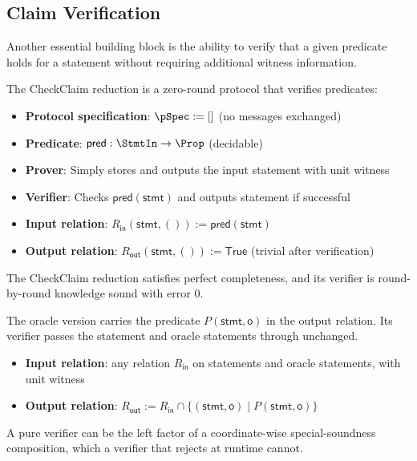 \subsection{Claim Verification}

Another essential building block is the ability to verify that a given predicate holds for a statement without requiring additional witness information.

\begin{definition}
    \label{def:checkclaim_reduction}
    The CheckClaim reduction is a zero-round protocol that verifies predicates:
    \begin{itemize}
        \item \textbf{Protocol specification}: $\pSpec := []$ (no messages exchanged)
        \item \textbf{Predicate}: $\mathsf{pred} : \StmtIn \to \Prop$ (decidable)
        \item \textbf{Prover}: Simply stores and outputs the input statement with unit witness
        \item \textbf{Verifier}: Checks $\mathsf{pred}(\mathsf{stmt})$ and outputs statement if successful
        \item \textbf{Input relation}: $R_{\mathsf{in}}(\mathsf{stmt}, ()) := \mathsf{pred}(\mathsf{stmt})$
        \item \textbf{Output relation}: $R_{\mathsf{out}}(\mathsf{stmt}, ()) := \mathsf{True}$ (trivial after verification)
    \end{itemize}
    \leanok
\end{definition}

\begin{theorem}
    The CheckClaim reduction satisfies perfect completeness, and its verifier is round-by-round knowledge sound with error $0$.
    \leanok
\end{theorem}

\begin{definition}
    \label{def:checkclaim_oracle_reduction}
    The oracle version carries the predicate $P(\mathsf{stmt}, \mathsf{o})$ in the output relation.
    Its verifier passes the statement and oracle statements through unchanged.
    \begin{itemize}
        \item \textbf{Input relation}: any relation $R_{\mathsf{in}}$ on statements and oracle statements, with unit witness
        \item \textbf{Output relation}: $R_{\mathsf{out}} := R_{\mathsf{in}} \cap \{(\mathsf{stmt}, \mathsf{o}) \mid P(\mathsf{stmt}, \mathsf{o})\}$
    \end{itemize}
    A pure verifier can be the left factor of a coordinate-wise special-soundness composition, which a verifier that rejects at runtime cannot.
    \leanok
\end{definition}

